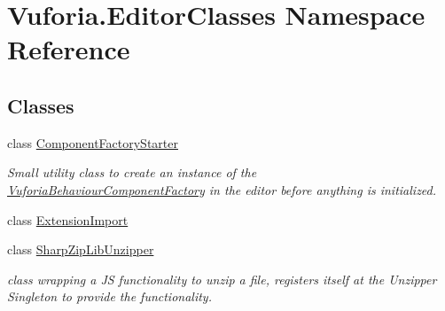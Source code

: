 \hypertarget{namespace_vuforia_1_1_editor_classes}{}\section{Vuforia.\+Editor\+Classes Namespace Reference}
\label{namespace_vuforia_1_1_editor_classes}
\subsection*{Classes}
\begin{DoxyCompactItemize}
\item 
class \hyperlink{class_vuforia_1_1_editor_classes_1_1_component_factory_starter}{Component\+Factory\+Starter}
\begin{DoxyCompactList}\small\item\em Small utility class to create an instance of the \hyperlink{class_vuforia_1_1_vuforia_behaviour_component_factory}{Vuforia\+Behaviour\+Component\+Factory} in the editor before anything is initialized. \end{DoxyCompactList}\item 
class \hyperlink{class_vuforia_1_1_editor_classes_1_1_extension_import}{Extension\+Import}
\item 
class \hyperlink{class_vuforia_1_1_editor_classes_1_1_sharp_zip_lib_unzipper}{Sharp\+Zip\+Lib\+Unzipper}
\begin{DoxyCompactList}\small\item\em class wrapping a J\+S functionality to unzip a file, registers itself at the Unzipper Singleton to provide the functionality. \end{DoxyCompactList}\end{DoxyCompactItemize}
